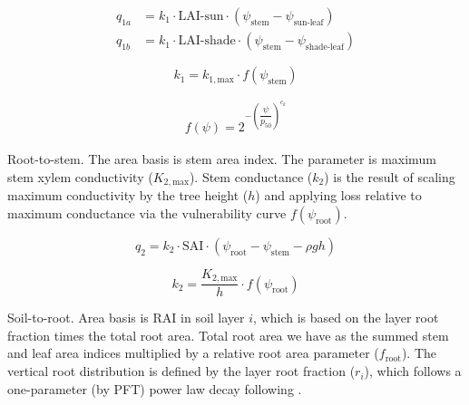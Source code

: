 \documentclass[draft,linenumbers]{agujournal}
\begin{document}
\begin{linenomath*} \begin{equation} \begin{aligned}
q_{1a} &= k_{1} \cdot \text{LAI-sun}  \cdot \left( \psi_{\text{stem}}-\psi_{\text{sun-leaf}}\right) \\
q_{1b} &= k_{1} \cdot \text{LAI-shade} \cdot  \left( \psi_{\text{stem}}-\psi_{\text{shade-leaf}}\right)
\end{aligned} \end{equation} \end{linenomath*}

\begin{linenomath*} \begin{equation}
k_{1} = k_{1,\text{max}} \cdot f\left(\psi_{\text{stem}}\right)
\end{equation} \end{linenomath*}

\begin{linenomath*} \begin{equation} \begin{aligned}
f\left(\psi\right)=2^{-\left(\dfrac{\psi}{p_{50}}\right)^{c_k}}
\end{aligned} \end{equation} \end{linenomath*}

Root-to-stem. The area basis is stem area index. 
The parameter is maximum stem xylem conductivity ($K_{2,\text{max}}$).
Stem conductance ($k_2$) is the result of scaling maximum conductivity by the tree height ($h$)
and applying loss relative to maximum conductance via the vulnerability curve $f\left(\psi_{\text{root}}\right)$. 
\begin{linenomath*} \begin{equation}
q_2 = k_2 \cdot  \text{SAI}  \cdot \left( \psi_{\text{root}}-\psi_{\text{stem}}-\rho g h\right)
\end{equation} \end{linenomath*}
\begin{linenomath*} \begin{equation}
k_2 = \dfrac{K_{2,\text{max}}}{h} \cdot f\left(\psi_{\text{root}}\right)
\end{equation} \end{linenomath*}

Soil-to-root. Area basis is RAI in soil layer $i$, which is based on the layer root fraction times the
total root area. Total root area we have as the summed stem and leaf area indices multiplied by a relative
root area parameter ($f_{\text{root}}$).
The vertical root distribution is defined by the layer root fraction ($r_i$), which follows a one-parameter 
(by PFT) power law decay following \citet{jackson1996}.
\end{document}
